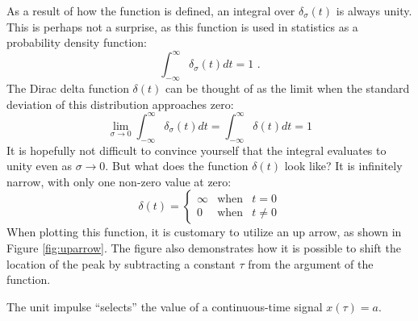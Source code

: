 As a result of how the function is defined, an integral over
$\delta_{\sigma}(t)$ is always unity. This is perhaps not a surprise,
as this function is used in statistics as a probability density
function:
\begin{equation}
  \int_{-\infty}^{\infty}\delta_\sigma(t)dt = 1 \,\,.
\end{equation}
The Dirac delta function $\delta(t)$ can be thought of as the limit when the standard deviation of this distribution approaches zero:
\begin{equation}
  \lim_{\sigma\rightarrow 0}  \int_{-\infty}^{\infty} \delta_\sigma(t) dt = \int_{-\infty}^{\infty} \delta(t) dt = 1
\end{equation}
It is hopefully not difficult to convince yourself that the integral
evaluates to unity even as $\sigma \rightarrow 0$. But what does the
function $\delta(t)$ look like? It is infinitely narrow, with only one non-zero value at zero:
\begin{equation}
  \delta(t) = \left\{ \begin{array}{ccc}
    \infty & \mathrm{when} & t=0     \\
    0      & \mathrm{when} & t \ne 0
  \end{array}\right.
\end{equation}
When plotting this function, it is customary to utilize an up arrow, as shown in Figure \ref{fig:uparrow}. The figure also demonstrates how it is possible to shift the location of the peak by subtracting a constant $\tau$ from the argument of the function.

\begin{marginfigure}[0cm]
  \begin{center}
  \end{center}
  \caption{The unit impulse ``selects'' the value of a continuous-time signal $x(\tau)=a$.}
\end{marginfigure}

